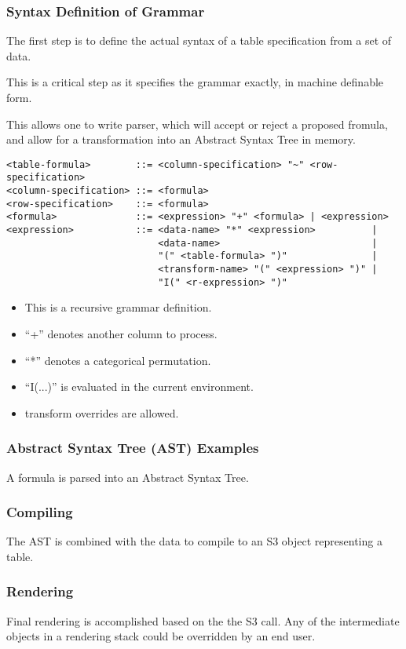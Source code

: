 \documentclass{beamer}
\begin{document}
  \begin{frame}
    \frametitle{Syntax Definition of Grammar}
   
    The first step is to define the actual syntax of a table specification
    from a set of data.

    This is a critical step as it specifies the grammar exactly, in machine
    definable form.

    This allows one to write parser, which will accept or reject a proposed fromula, and allow for a transformation into an Abstract Syntax Tree in memory.
   
  \end{frame} 

{\small
\begin{verbatim}
<table-formula>        ::= <column-specification> "~" <row-specification>
<column-specification> ::= <formula>
<row-specification>    ::= <formula>
<formula>              ::= <expression> "+" <formula> | <expression>
<expression>           ::= <data-name> "*" <expression>          | 
                           <data-name>                           |
                           "(" <table-formula> ")"               | 
                           <transform-name> "(" <expression> ")" |
                           "I(" <r-expression> ")"
\end{verbatim}
}   
\begin{itemize}
\item This is a recursive grammar definition.
\item ``+'' denotes another column to process.
\item ``*'' denotes a categorical permutation.
\item ``I(...)'' is evaluated in the current environment.
\item transform overrides are allowed.
\end{itemize}

  \begin{frame}
    \frametitle{Abstract Syntax Tree (AST) Examples}
    A formula is parsed into an Abstract Syntax Tree.
  \end{frame}      

  \begin{frame}
    \frametitle{Compiling}
    The AST is combined with the data to compile to an S3 object representing a table.
  \end{frame}      

  \begin{frame}
    \frametitle{Rendering}
    Final rendering is accomplished based on the the S3 call. Any of the intermediate objects in a rendering stack could be overridden by an end user.
  \end{frame}      
\end{document}
